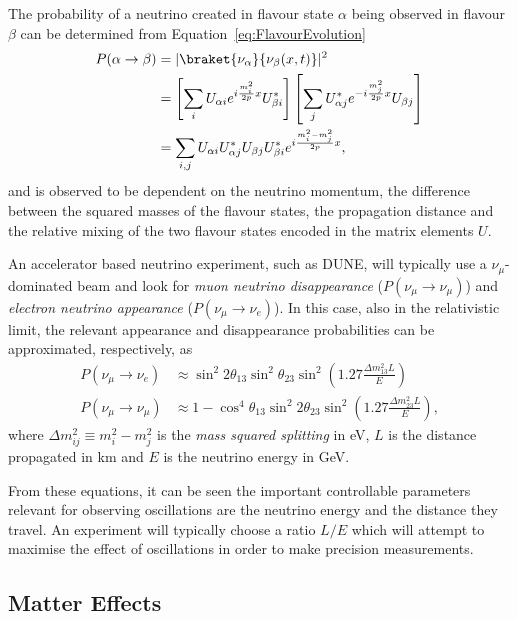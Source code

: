 The probability of a neutrino created in flavour state $\alpha$ being observed in flavour $\beta$ can be determined from Equation~\ref{eq:FlavourEvolution}
\begin{align}
  P(\alpha \rightarrow \beta) &= |\braket{\nu_{\alpha}}{\nu_{\beta}(x,t)}|^2 \\
  &= \left[ \sum_i U_{\alpha i} e^{i \frac{m_i^2}{2p} x} U_{\beta i}^* \right] \left[ \sum_j U_{\alpha j}^* e^{-i \frac{m_j^2}{2p} x} U_{\beta j} \right] \\
  &= \sum_{i,j} U_{\alpha i} U_{\alpha j}^* U_{\beta j} U_{\beta i}^* e^{i \frac{m_i^2-m_j^2}{2p} x},
\end{align}
and is observed to be dependent on the neutrino momentum, the difference between the squared masses of the flavour states, the propagation distance and the relative mixing of the two flavour states encoded in the matrix elements $U$.

An accelerator based neutrino experiment, such as DUNE, will typically use a $\nu_{\mu}$-dominated beam and look for \textit{muon neutrino disappearance} ($P(\nu_{\mu}\rightarrow \nu_{\mu})$) and \textit{electron neutrino appearance} ($P(\nu_{\mu}\rightarrow \nu_e)$).  In this case, also in the relativistic limit, the relevant appearance and disappearance probabilities can be approximated, respectively, as
\begin{align}
  \label{eq:ElectronNeutrinoAppearance} P(\nu_{\mu} \rightarrow \nu_e) &\approx \sin^2{2\theta_{13}} \sin^2{\theta_{23}} \sin^2 {\left( 1.27 \frac{\Delta m_{13}^2 L}{E} \right)} \\
  \label{eq:MuonNeutrinoDisappearance} P(\nu_{\mu} \rightarrow \nu_{\mu}) &\approx 1 - \cos^4{\theta_{13}} \sin^2{2\theta_{23}} \sin^2{ \left( 1.27 \frac{\Delta m_{23}^2 L}{E} \right) },
\end{align}
where $\Delta m_{ij}^2 \equiv m_i^2-m_j^2$ is the \textit{mass squared splitting} in eV, $L$ is the distance propagated in km and $E$ is the neutrino energy in GeV.

From these equations, it can be seen the important controllable parameters relevant for observing oscillations are the neutrino energy and the distance they travel.  An experiment will typically choose a ratio $L/E$ which will attempt to maximise the effect of oscillations in order to make precision measurements.

\subsection{Matter Effects}\label{sec:MatterEffects}

